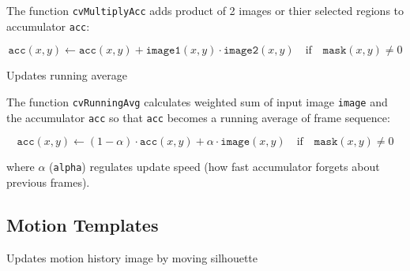 The function \texttt{cvMultiplyAcc} adds product of 2 images or thier selected regions to accumulator \texttt{acc}:

\[ \texttt{acc}(x,y) \leftarrow \texttt{acc}(x,y) + \texttt{image1}(x,y) \cdot \texttt{image2}(x,y) \quad \text{if} \quad \texttt{mask}(x,y) \ne 0 \]

\label{RunningAvg}

Updates running average


\begin{description}
\end{description}

The function \texttt{cvRunningAvg} calculates weighted sum of input image
\texttt{image} and the accumulator \texttt{acc} so that \texttt{acc}
becomes a running average of frame sequence:

\[ \texttt{acc}(x,y) \leftarrow (1-\alpha) \cdot \texttt{acc}(x,y) + \alpha \cdot \texttt{image}(x,y) \quad \text{if} \quad \texttt{mask}(x,y) \ne 0 \]

where $\alpha$ (\texttt{alpha}) regulates update speed (how fast accumulator forgets about previous frames).

\subsection{Motion Templates}

\label{UpdateMotionHistory}

Updates motion history image by moving silhouette


